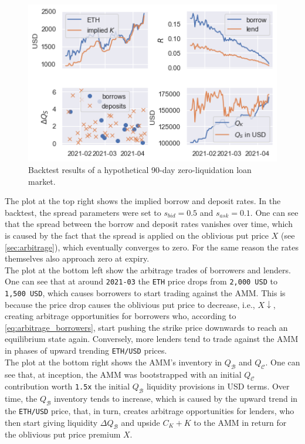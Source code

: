 \documentclass[a4paper]{article}
\begin{document}
\begin{figure}
    \centering
    \includegraphics[width=1.0\textwidth]{figures/simulation_3M_4.png}
    \cprotect\caption{\small Backtest results of a hypothetical 90-day zero-liquidation loan market.}
    \label{fig:simulation}
\end{figure}

The plot at the top right shows the implied borrow and deposit rates. In the backtest, the spread parameters were set to $s_{bid}=0.5$ and $s_{ask}=0.1$. One can see that the spread between the borrow and deposit rates vanishes over time, which is caused by the fact that the spread is applied on the oblivious put price $X$ (see \cref{sec:arbitrage}), which eventually converges to zero. For the same reason the rates themselves also approach zero at expiry.\\

The plot at the bottom left show the arbitrage trades of borrowers and lenders. One can see that at around \verb|2021-03| the \verb|ETH| price drops from \verb|2,000 USD| to \verb|1,500 USD|, which causes borrowers to start trading against the AMM. This is because the price drop causes the oblivious put price to decrease, i.e., $X\downarrow$, creating arbitrage opportunities for borrowers who, according to \cref{eq:arbitrage_borrowers}, start pushing the strike price downwards to reach an equilibrium state again. Conversely, more lenders tend to trade against the AMM in phases of upward trending \verb|ETH/USD| prices.\\

The plot at the bottom right shows the AMM's inventory in $Q_\mathcal{B}$ and $Q_\mathcal{C}$. One can see that, at inception, the AMM was bootstrapped with an initial $Q_\mathcal{C}$ contribution worth \verb|1.5x| the initial $Q_\mathcal{B}$ liquidity provisions in USD terms. Over time, the $Q_\mathcal{B}$ inventory tends to increase, which is caused by the upward trend in the \verb|ETH/USD| price, that, in turn, creates arbitrage opportunities for lenders, who then start giving liquidity $\Delta Q_\mathcal{B}$ and upside $C_K+K$ to the AMM in return for the oblivious put price premium $X$.\\
\end{document}
